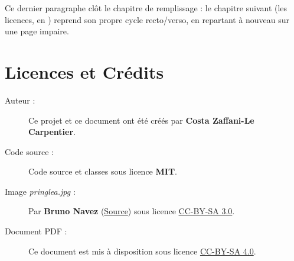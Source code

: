 \documentclass[theme=pringlea]{myrtillebook}
\begin{document}
Ce dernier paragraphe clôt le chapitre de remplissage : le chapitre suivant (les licences, en ) reprend son propre cycle recto/verso, en repartant à nouveau sur une page impaire.

\backmatter

\chapter*{Licences et Crédits}
\begin{description}
    \item[Auteur :] Ce projet et ce document ont été créés par \textbf{Costa Zaffani-Le Carpentier}.
    \item[Code source :] Code source  et classes  sous licence \textbf{MIT}.
    \item[Image \textit{pringlea.jpg} :] Par \textbf{Bruno Navez} (\href{https://commons.wikimedia.org/wiki/File:Pringlea_antiscorbutica.JPG}{Source}) sous licence \href{https://creativecommons.org/licenses/by-sa/3.0/deed.fr}{CC-BY-SA 3.0}.
    \item[Document PDF :] Ce document est mis à disposition sous licence \href{https://creativecommons.org/licenses/by-sa/4.0/deed.fr}{CC-BY-SA 4.0}.
\end{description}
\end{document}
